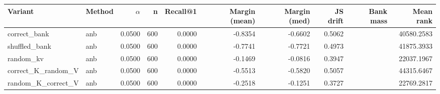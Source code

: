 \begin{tabular}{l l r r r r r r r r}
\toprule
Variant & Method & $\alpha$ & n & Recall@1 & Margin (mean) & Margin (med) & JS drift & Bank mass & Mean rank \\
\midrule
correct\_bank & anb & 0.0500 & 600 & 0.0000 & -0.8354 & -0.6602 & 0.5062 &  & 40580.2583 \\
shuffled\_bank & anb & 0.0500 & 600 & 0.0000 & -0.7741 & -0.7721 & 0.4973 &  & 41875.3933 \\
random\_kv & anb & 0.0500 & 600 & 0.0000 & -0.1469 & -0.0816 & 0.3947 &  & 22037.1967 \\
correct\_K\_random\_V & anb & 0.0500 & 600 & 0.0000 & -0.5513 & -0.5820 & 0.5057 &  & 44315.6467 \\
random\_K\_correct\_V & anb & 0.0500 & 600 & 0.0000 & -0.2518 & -0.1251 & 0.3727 &  & 22769.2817 \\
\bottomrule
\end{tabular}

